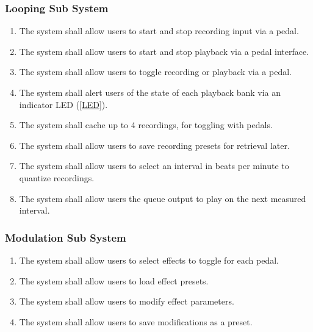     \subsubsection{Looping Sub System}
        \begin{enumerate}[label=\alph*.]
            \item The system shall allow users to start and stop recording input via a pedal.
            \item The system shall allow users to start and stop playback via a pedal interface.
            \item The system shall allow users to toggle recording or playback via a pedal.
            \item The system shall alert users of the state of each playback bank via an indicator LED (\ref{LED}).
            \item The system shall cache up to 4 recordings, for toggling with pedals.
            
            \item The system shall allow users to save recording presets for retrieval later.
            \item The system shall allow users to select an interval in beats per minute to quantize recordings.
            \item The system shall allow users the queue output to play on the next measured interval.

        \end{enumerate}
    
    \subsubsection{Modulation Sub System}
    \begin{enumerate}[label=\alph*.]
        \item The system shall allow users to select effects to toggle for each pedal.
        \item The system shall allow users to load effect presets.
        \item The system shall allow users to modify effect parameters.
        \item The system shall allow users to save modifications as a preset.
    \end{enumerate}
    
